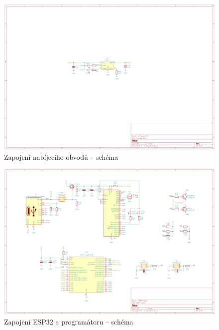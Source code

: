 \begin{figure}
    \centering
    \includegraphics[width=\textwidth]{kapitoly/ctvrta_elektronicka_varianta/E4_zapojeni/nabijecka.pdf}
    \caption{Zapojení nabíjecího obvodů -- schéma}
    \label{fig:E4-sch_nabijecka}
\end{figure}
\begin{figure}[htbp]
    \centering
    \includegraphics[width=\textwidth]{kapitoly/ctvrta_elektronicka_varianta/E4_zapojeni/ESP32.pdf}
    \caption{Zapojení ESP32 a programátoru -- schéma}
    \label{fig:E4-sch_ESP32}
\end{figure}
